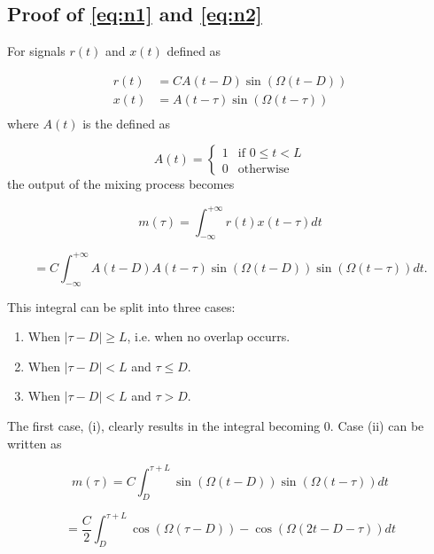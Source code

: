 \begin{appendices}
\chapter{Proof of \ref{eq:n1} and \ref{eq:n2}}

For signals $r(t)$ and $x(t)$ defined as

\begin{equation}
	\begin{split}
		r(t) &= CA(t - D)\sin(\Omega(t - D)) \\
		x(t) &= A(t - \tau)\sin(\Omega(t - \tau)) \\
	\end{split}
\end{equation}
where $A(t)$ is the defined as 

\begin{equation}
	A(t) = \begin{cases}
		1 & \text{if $0 \leq t < L$} \\
		0 & \text{otherwise}
	\end{cases}
\end{equation}
the output of the mixing process becomes

\begin{equation}
	m(\tau) 
	= \int_{-\infty}^{+\infty}r(t)x(t-\tau)dt
\end{equation}

\begin{equation}	
	= C \int_{-\infty}^{+\infty}A(t-D)A(t-\tau)\sin(\Omega(t-D))\sin(\Omega(t-\tau))dt.
\end{equation}

This integral can be split into three cases:

\begin{enumerate}[label=(\roman*)]
	\item When $|\tau-D| \geq L$, i.e. when no overlap occurrs. 
	\item When $|\tau-D| < L$ and $\tau \leq D$.
	\item When $|\tau-D| < L$ and $\tau > D$.
\end{enumerate}

The first case, (i), clearly results in the integral becoming 0. Case (ii) can be written as

\begin{equation}
	m(\tau)
	= C\int_{D}^{\tau+L}\sin(\Omega(t-D))\sin(\Omega(t-\tau))dt
\end{equation}

\begin{equation}
	= \frac{C}{2}\int_D^{\tau+L} \cos(\Omega(\tau-D)) - \cos(\Omega(2t - D - \tau))dt
\end{equation}


\end{appendices}
